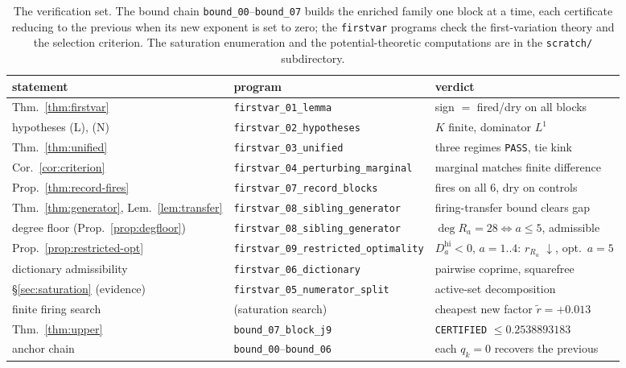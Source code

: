 \documentclass[11pt,reqno]{amsart}
\theoremstyle{plain}
\theoremstyle{definition}
\newcommand{\rb}[1]{r_{#1}}   %
\begin{document}
\begin{table}[h]
\centering\small
\renewcommand{\arraystretch}{1.15}
\begin{tabular}{@{}lll@{}}
\toprule
statement & program & verdict\\
\midrule
Thm.~\ref{thm:firstvar} & \texttt{firstvar\_01\_lemma} & sign $=$ fired/dry on all blocks\\
\quad hypotheses (L), (N) & \texttt{firstvar\_02\_hypotheses} & $K$ finite, dominator $L^1$\\
Thm.~\ref{thm:unified} & \texttt{firstvar\_03\_unified} & three regimes \texttt{PASS}, tie kink\\
Cor.~\ref{cor:criterion} & \texttt{firstvar\_04\_perturbing\_marginal} & marginal matches finite difference\\
Prop.~\ref{thm:record-fires} & \texttt{firstvar\_07\_record\_blocks} & fires on all 6, dry on controls\\
Thm.~\ref{thm:generator}, Lem.~\ref{lem:transfer} & \texttt{firstvar\_08\_sibling\_generator} & firing-transfer bound clears gap\\
\quad degree floor (Prop.~\ref{prop:degfloor}) & \texttt{firstvar\_08\_sibling\_generator} & $\deg R_a{=}28\!\iff\!a{\le}5$, admissible\\
Prop.~\ref{prop:restricted-opt} & \texttt{firstvar\_09\_restricted\_optimality} & $D_a^{\mathrm{hi}}{<}0$, $a{=}1..4$: $\rb{R_a}$ $\downarrow$, opt.\ $a{=}5$\\
\quad dictionary admissibility & \texttt{firstvar\_06\_dictionary} & pairwise coprime, squarefree\\
\S\ref{sec:saturation} (evidence) & \texttt{firstvar\_05\_numerator\_split} & active-set decomposition\\
\quad finite firing search & (saturation search) & cheapest new factor $\widetilde r=+0.013$\\
Thm.~\ref{thm:upper} & \texttt{bound\_07\_block\_j9} & \texttt{CERTIFIED} $\le0.2538893183$\\
\quad anchor chain & \texttt{bound\_00}--\texttt{bound\_06} & each $q_k{=}0$ recovers the previous\\
\bottomrule
\end{tabular}
\medskip
\caption{The verification set. The bound chain \texttt{bound\_00}--\texttt{bound\_07}
builds the enriched family one block at a time, each certificate reducing to the
previous when its new exponent is set to zero; the \texttt{firstvar} programs check
the first-variation theory and the selection criterion. The saturation enumeration and
the potential-theoretic computations are in the \texttt{scratch/} subdirectory.}
\label{tab:verify}
\end{table}
\end{document}
